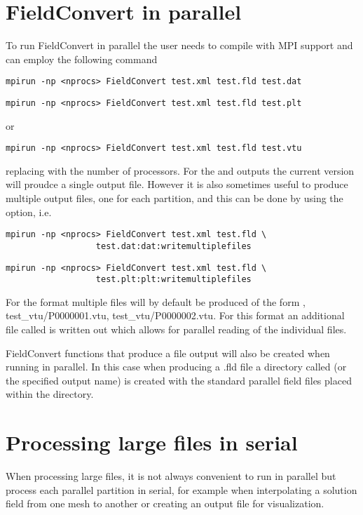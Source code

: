 \section{FieldConvert in parallel}
To run FieldConvert in parallel the user needs to compile
\nekpp with MPI support and can employ the following
command
\begin{lstlisting}[style=BashInputStyle]
mpirun -np <nprocs> FieldConvert test.xml test.fld test.dat
\end{lstlisting}
\begin{lstlisting}[style=BashInputStyle]
mpirun -np <nprocs> FieldConvert test.xml test.fld test.plt
\end{lstlisting}
or
\begin{lstlisting}[style=BashInputStyle]
mpirun -np <nprocs> FieldConvert test.xml test.fld test.vtu
\end{lstlisting}
replacing  with the number of processors. For the
 and  outputs the current version will proudce
a single output file.  However it is also sometimes useful to produce
multiple output files, one for each partition, and this
can be done by using the  option, i.e.
\begin{lstlisting}[style=BashInputStyle]
  mpirun -np <nprocs> FieldConvert test.xml test.fld \
                  test.dat:dat:writemultiplefiles
\end{lstlisting}
\begin{lstlisting}[style=BashInputStyle]
  mpirun -np <nprocs> FieldConvert test.xml test.fld \
                  test.plt:plt:writemultiplefiles
\end{lstlisting}

For the  format multiple files will by default be produced
of the form , {test\_vtu/P0000001.vtu},
{test\_vtu/P0000002.vtu}. For this format an additional file called
\inltt{test.pvtu} is written out which allows for parallel reading of the
individual \inltt{.vtu} files.

FieldConvert functions that produce a  file output will
also be created when running in parallel. In this case when producing
a .fld file a directory called \inltt{test.fld} (or the specified
output name) is created with the standard parallel field files placed
within the directory.
%
%
%
\section{Processing large files in serial}
When processing large files, it is not always convenient to run in parallel but
process each parallel partition in serial, for example when interpolating a
solution field from one mesh to another or creating an output file for
visualization.

